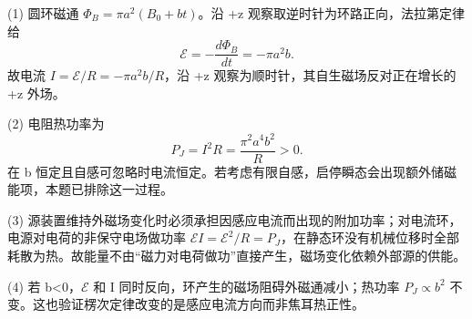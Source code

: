 (1) 圆环磁通 \(\Phi_B=\pi a^2(B_0+bt)\)。沿 +z 观察取逆时针为环路正向，法拉第定律给
\[
\mathcal E=-\frac{d\Phi_B}{dt}=-\pi a^2b .
\]
故电流 \(I=\mathcal E/R=-\pi a^2b/R\)，沿 +z 观察为顺时针，其自生磁场反对正在增长的 +z 外场。

(2) 电阻热功率为
\[
P_J=I^2R=\frac{\pi^2a^4b^2}{R}>0.
\]
在 b 恒定且自感可忽略时电流恒定。若考虑有限自感，启停瞬态会出现额外储磁能项，本题已排除这一过程。

(3) 源装置维持外磁场变化时必须承担因感应电流而出现的附加功率；对电流环，电源对电荷的非保守电场做功率 \(\mathcal E I=\mathcal E^2/R=P_J\)，在静态环没有机械位移时全部耗散为热。故能量不由“磁力对电荷做功”直接产生，磁场变化依赖外部源的供能。

(4) 若 b<0，\(\mathcal E\) 和 I 同时反向，环产生的磁场阻碍外磁通减小；热功率 \(P_J\propto b^2\) 不变。这也验证楞次定律改变的是感应电流方向而非焦耳热正性。
